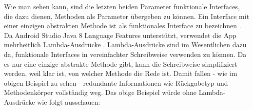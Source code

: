 \begin{Shaded}
\begin{Highlighting}[]
  \NormalTok{,}
  \NormalTok{, }\NormalTok{, }
         \CommentTok{// }
\NormalTok{     \},}
         \CommentTok{// }
\NormalTok{     \});}
     
\NormalTok{();}
\end{Highlighting}
\end{Shaded}

Wie man sehen kann, sind die letzten beiden Parameter funktionale
Interfaces, die dazu dienen, Methoden als Parameter übergeben zu können.
Ein Interface mit einer einzigen abstrakten Methode ist als funktionales
Interface zu bezeichnen \cite{lambda}. Da Android Studio Java 8 Language
Features unterstützt, verwendet die App mehrheitlich Lambda-Ausdrücke
\cite{java8}. Lambda-Ausdrücke sind im Wesentlichen dazu da, funktionale
Interfaces in vereinfachter Schreibweise verwenden zu können. Da es nur
eine einzige abstrakte Methode gibt, kann die Schreibweise simplifiziert
werden, weil klar ist, von welcher Methode die Rede ist. Damit fallen -
wie im obigen Beispiel zu sehen - redundante Informationen wie
Rückgabetyp und Methodenkörper vollständig weg. Das obige Beispiel würde
ohne Lambda-Ausdrücke wie folgt ausschauen:

\begin{Shaded}
\begin{Highlighting}[]
  \NormalTok{, }
 \NormalTok{, }\NormalTok{,}
      \NormalTok{() \{}
           \NormalTok{(}
             \CommentTok{// }
\NormalTok{         \}}
\NormalTok{     \},}
      \NormalTok{() \{}
           \NormalTok{(}
             \CommentTok{// }
\NormalTok{         \}}
\NormalTok{     \});}

\NormalTok{();}
\end{Highlighting}
\end{Shaded}

